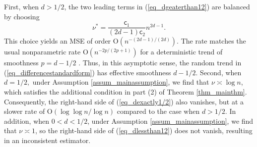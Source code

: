 \documentclass[11pt]{article}
\newcommand{\sfc}{\mathsf{c}}
\newcommand{\OO}{\mathrm{O}}
\numberwithin{equation}{section}
\numberwithin{figure}{section}
\begin{document}
First, when $d > 1/2$, the two leading terms in (\ref{eq_dgeaterthan12}) are balanced by choosing
\[
\nu^*=\frac{\sfc_1}{(2d-1)\sfc_2}n^{2d-1}.
\]
This choice yields an MSE of order $\OO(n^{-(2d-1)/(2d)})$. The rate matches the usual nonparametric rate $\OO(n^{-2p/(2p+1)})$ for a deterministic trend of smoothness $p=d-1/2$ \cite{stone1982}. Thus, in this asymptotic sense, the random trend in (\ref{eq_differencestandardform}) has effective smoothness $d-1/2$. Second, when $d = 1/2,$ under Assumption \ref{assum_mainassumption}, we find that $\nu \asymp \log n$, which satisfies the additional condition in part (2) of Theorem \ref{thm_mainthm}. Consequently, the right-hand side of (\ref{eq_dexactly1/2}) also vanishes, but at a slower rate of $\OO(\log \log n / \log n)$ compared to the case when $d > 1/2.$ In addition, when $0 < d < 1/2$, under Assumption \ref{assum_mainassumption}, we find that $\nu \asymp 1$, so the right-hand side of (\ref{eq_dlessthan12}) does not vanish, resulting in an inconsistent estimator.
\end{document}
